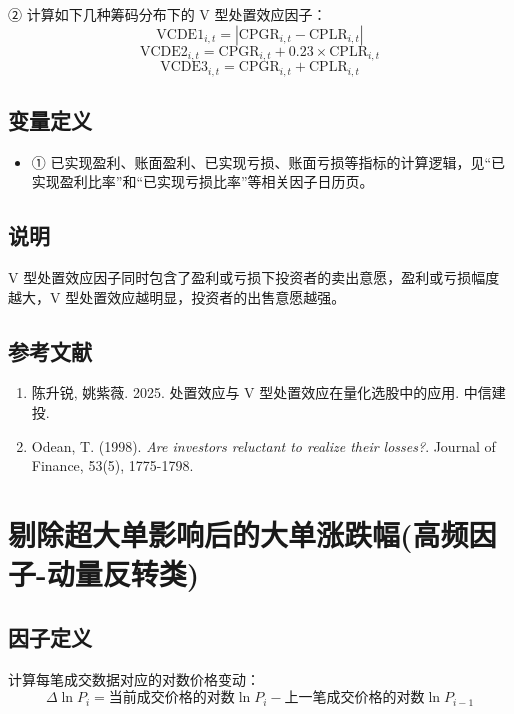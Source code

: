 \documentclass{article}
\begin{document}
② 计算如下几种筹码分布下的 V 型处置效应因子：
\begin{equation}
    \mathrm{VCDE1}_{i,t} = |\mathrm{CPGR}_{i,t} - \mathrm{CPLR}_{i,t}|
\end{equation}
\begin{equation}
    \mathrm{VCDE2}_{i,t} = \mathrm{CPGR}_{i,t} + 0.23 \times \mathrm{CPLR}_{i,t}
\end{equation}
\begin{equation}
    \mathrm{VCDE3}_{i,t} = \mathrm{CPGR}_{i,t} + \mathrm{CPLR}_{i,t}
\end{equation}

\subsection{变量定义}
\begin{itemize}
    \item ① 已实现盈利、账面盈利、已实现亏损、账面亏损等指标的计算逻辑，见“已实现盈利比率”和“已实现亏损比率”等相关因子日历页。
\end{itemize}

\subsection{说明}
V 型处置效应因子同时包含了盈利或亏损下投资者的卖出意愿，盈利或亏损幅度越大，V 型处置效应越明显，投资者的出售意愿越强。

\subsection{参考文献}
\begin{enumerate}
    \item 陈升锐, 姚紫薇. 2025. 处置效应与 V 型处置效应在量化选股中的应用. 中信建投.
    \item Odean, T. (1998). \textit{Are investors reluctant to realize their losses?}. Journal of Finance, 53(5), 1775-1798.
\end{enumerate}

\section{剔除超大单影响后的大单涨跌幅(高频因子-动量反转类)}

\subsection{因子定义}

计算每笔成交数据对应的对数价格变动：
\begin{equation}
    \Delta \ln P_i = \text{当前成交价格的对数}\ln P_i - \text{上一笔成交价格的对数}\ln P_{i-1}
\end{equation}
\end{document}

